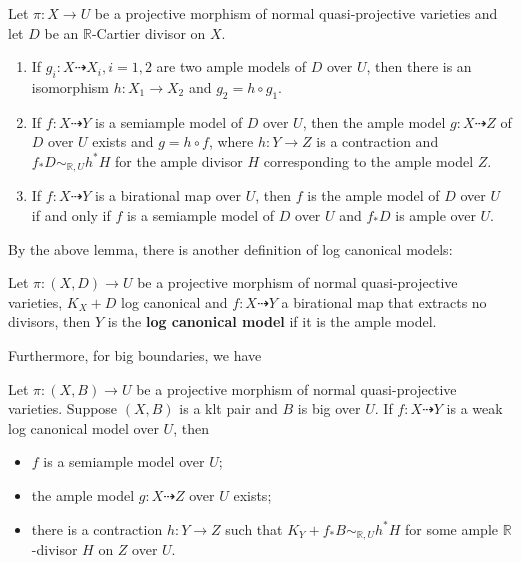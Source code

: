 \begin{lem}\cite[Lemma 3.6.6]{BCHM10}
	Let $\pi:X \to U$ be a projective morphism of normal quasi-projective varieties and let $D$ be an $\mathbb{R}$-Cartier divisor on $X$.
	\begin{enumerate}
		\item If $g_{i}:X \dashrightarrow X_{i}, i=1,2$ are two ample models of $D$ over $U$, then there is an isomorphism $h:X_{1}\to X_{2}$ and $g_{2}=h \circ g_{1}$.
		\item If $f:X \dashrightarrow Y$ is a semiample model of $D$ over $U$, then the ample model $g:X \dashrightarrow  Z$ of $D$ over $U$   exists and $g=h \circ f$, where $h:Y \to Z$ is a contraction and $f_*D \sim_{\mathbb{R},U}h^*H$ for the ample divisor $H$ corresponding to the ample model $Z$.
		\item  If $f:X \dashrightarrow Y$ is a birational map over $U$, then $f$ is the ample model of $D$ over $U$ if and only if $f$ is a semiample model of $D$ over $U$ and $f_*D$ is ample over $U$.
	\end{enumerate}
\end{lem}

By the above lemma, there is another definition of log canonical models:

\begin{defn}
	Let $ \pi:(X, D)\to U $ be a projective morphism of normal quasi-projective varieties, $ K_X+D $ log canonical and $ f: X\dashrightarrow Y $  a birational map that extracts no divisors, then $ Y $ is the \textbf{log canonical model} if it is the ample model.
\end{defn}

Furthermore, for big boundaries, we have
\begin{lem}\cite[Lemma 3.9.3]{BCHM10} Let $ \pi:(X,B)\to U $ be a projective morphism of normal quasi-projective varieties. Suppose $(X, B)$ is a klt pair and  $B$ is big over $U$. If $f:X\dashrightarrow Y$ is a weak log canonical model over $U$, then
	\begin{itemize}
		\item $f$ is a semiample model over $U$;
		\item  the ample model $g:X \dashrightarrow Z$ over $U$ exists;
		\item  there is a contraction $h:Y\to Z$ such that $K_{Y}+f_*B\sim_{\mathbb{R},U} h^*H$ for some ample $\mathbb{R}$-divisor $H$ on $Z$ over $U$.
	\end{itemize}
\end{lem}

